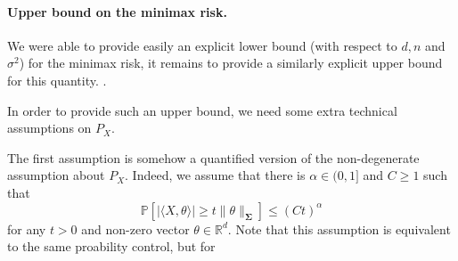 \documentclass[
	fontsize=11pt, %
	twoside=false, %
	numbers=noenddot, %
]{kaobook}
\DeclareMathOperator{\bSigma}{\boldsymbol \Sigma}
\renewcommand{\P}{\mathbb P}
\newcommand{\R}{\mathbb R}
\newcommand{\norm}[1]{\|#1\|}
\newcommand{\inr}[1]{\langle #1 \rangle}
\begin{document}
\paragraph{Upper bound on the minimax risk.} 

We were able to provide easily an explicit lower bound (with respect to $d, n$ and $\sigma^2$) for the minimax risk, it remains to provide a similarly explicit upper bound for this quantity.
.

In order to provide such an upper bound, we need some extra technical assumptions on $P_X$.

The first assumption is somehow a quantified version of the non-degenerate assumption about $P_X$. 
Indeed, we assume that there is $\alpha \in (0, 1]$ and $C \geq 1$ such that
\begin{equation}
	\label{eq:quanti-nondegenerate}
	\P[ |\inr{X, \theta} | \geq t \norm{\theta}_{\bSigma} ] \leq (C t)^\alpha
\end{equation}
for any $t > 0$ and non-zero vector $\theta \in \R^d$. Note that this assumption is equivalent to the same proability control, but for 
\end{document}
